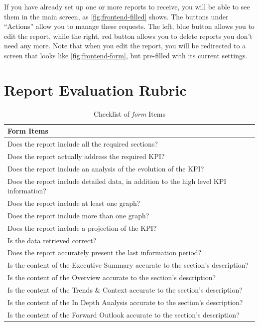 \documentclass[a4paper]{report}
\begin{document}
If you have already set up one or more reports to receive, you will be able to see them in the main screen, as \autoref{fig:frontend-filled} shows. The buttons under ``Actions'' allow you to manage these requests. The left, blue button allows you to edit the report, while the right, red button allows you to delete reports you don't need any more. Note that when you edit the report, you will be redirected to a screen that looks like \autoref{fig:frontend-form}, but pre-filled with its current settings.

\chapter{Report Evaluation Rubric}
\label{annex:evaluation}

\begin{table}[H]
\centering
\begin{tabular}{|p{14cm}|}
    \hline
    \textbf{Form Items} \\ \hline
    Does the report include all the required sections? \\ \hline
    Does the report actually address the required KPI? \\ \hline
    Does the report include an analysis of the evolution of the KPI? \\ \hline
    Does the report include detailed data, in addition to the high level KPI information? \\ \hline
    Does the report include at least one graph? \\ \hline
    Does the report include more than one graph? \\ \hline
    Does the report include a projection of the KPI? \\ \hline
    Is the data retrieved correct? \\ \hline
    Does the report accurately present the last information period? \\ \hline
    Is the content of the Executive Summary accurate to the section's description? \\ \hline
    Is the content of the Overview accurate to the section's description? \\ \hline
    Is the content of the Trends \& Context accurate to the section's description? \\ \hline
    Is the content of the In Depth Analysis accurate to the section's description? \\ \hline
    Is the content of the Forward Outlook accurate to the section's description? \\ \hline
\end{tabular}
\caption{Checklist of \textit{form} Items}
\end{table}
\end{document}
